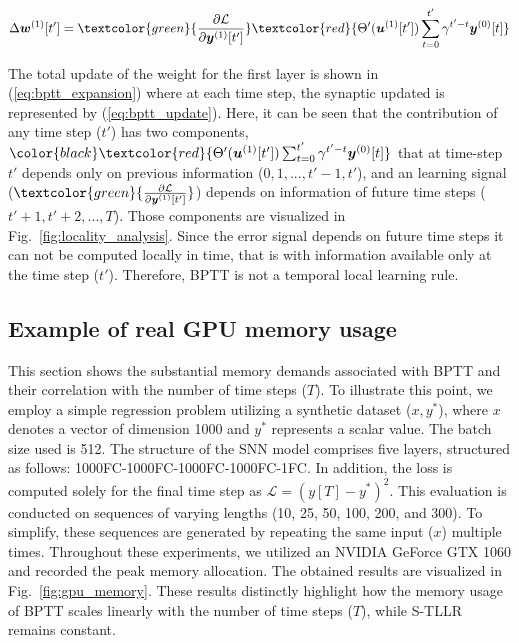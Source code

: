 \documentclass[10pt]{article} %
\begin{document}
    \begin{equation}
        \Delta \boldsymbol{w}^{(1)} [t'] = \textcolor{green}{\frac{\partial \mathcal{L}}{\partial \boldsymbol{y}^{(1)}[t']}} \textcolor{red}{\Theta'(\boldsymbol{u}^{(1)}[t']) \sum^{t'}_{t=0}  \gamma^{t'-t} \boldsymbol{y}^{(0)}[t]}
        \label{eq:bptt_update}
    \end{equation}

    The total update of the weight for the first layer is shown in (\ref{eq:bptt_expansion}) where at each time step, the synaptic updated is represented by (\ref{eq:bptt_update}). 
    Here, it can be seen that the contribution of any time step ($t'$) has two components, $\color{black}\textcolor{red}{\Theta'(\boldsymbol{u}^{(1)}[t']) \sum^{t'}_{t=0}  \gamma^{t'-t} \boldsymbol{y}^{(0)}[t]}$ that at time-step $t'$ depends only on previous information ($0,1, ..., t'-1, t'$), and an learning signal ($\textcolor{green}{\frac{\partial \mathcal{L}}{\partial \boldsymbol{y}^{(1)}[t']}}$) depends on information of future time steps ($t'+1, t'+2, ..., T$). 
    Those components are visualized in Fig.~\ref{fig:locality_analysis}. 
    Since the error signal depends on future time steps it can not be computed locally in time, that is with information available only at the time step ($t'$).
    Therefore, BPTT is not a temporal local learning rule. 

    \subsection{Example of real GPU memory usage}\label{sec:gpu_memory}
    This section shows the substantial memory demands associated with BPTT and their correlation with the number of time steps ($T$).
    To illustrate this point, we employ a simple regression problem utilizing a synthetic dataset ($x, y^*$), where $x$ denotes a vector of dimension 1000 and $y^*$ represents a scalar value. 
    The batch size used is 512. 
    The structure of the SNN model comprises five layers, structured as follows: 1000FC-1000FC-1000FC-1000FC-1FC. 
    In addition, the loss is computed solely for the final time step as $\mathcal{L}=(y[T]-y^*)^2$. 
    This evaluation is conducted on sequences of varying lengths (10, 25, 50, 100, 200, and 300). 
    To simplify, these sequences are generated by repeating the same input ($x$) multiple times.
    Throughout these experiments, we utilized an NVIDIA GeForce GTX 1060 and recorded the peak memory allocation. 
    The obtained results are visualized in Fig.~\ref{fig:gpu_memory}. 
    These results distinctly highlight how the memory usage of BPTT scales linearly with the number of time steps ($T$), while S-TLLR remains constant.
    
\end{document}
